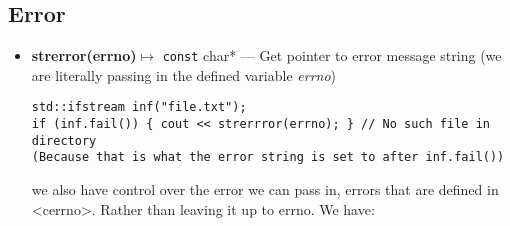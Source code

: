 \documentclass{report}
\begin{document}
    \bigbreak \noindent 
    \subsection{Error}
    \begin{itemize}
        \item \textbf{strerror(errno)}$\mapsto$ \texttt{const} char* ---  Get pointer to error message string (we are literally passing in the defined variable \textit{errno})
            \begin{verbatim}
std::ifstream inf("file.txt");
if (inf.fail()) { cout << strerrror(errno); } // No such file in directory 
(Because that is what the error string is set to after inf.fail())
            \end{verbatim}
        we also have control over the error we can pass in, errors that are defined in <cerrno>. Rather than leaving it up to errno. We have:


\end{itemize}
\end{document}
